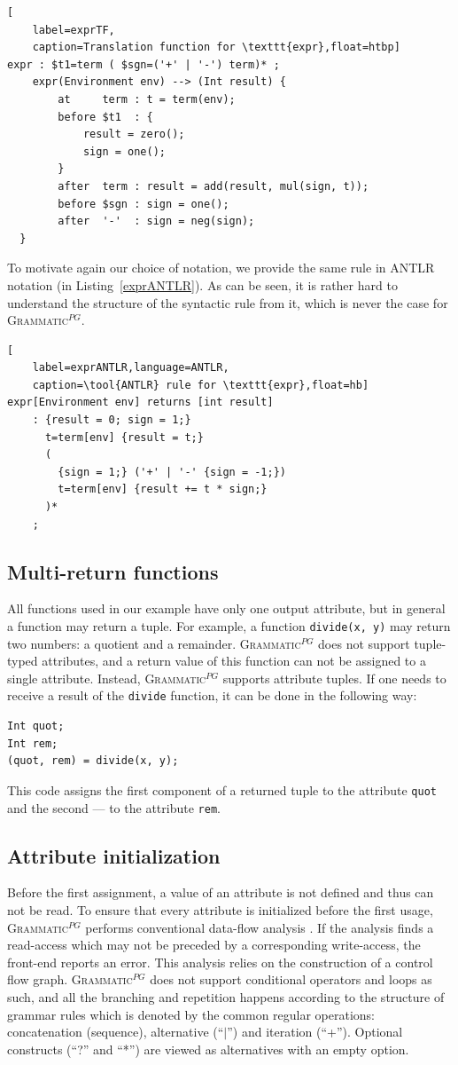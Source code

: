 \documentclass{llncs2e/llncs}
\newcommand{\lstref}[1]{Listing~\ref{#1}}
\newcommand{\tool}[1]{\textsc{#1}}
\newcommand{\ATF}{\textsc{Grammatic}$^{PG}$}
\begin{document}
\begin{lstlisting}[
	label=exprTF,
	caption=Translation function for \texttt{expr},float=htbp]
expr : $t1=term ( $sgn=('+' | '-') term)* ;         
	expr(Environment env) --> (Int result) {  
  		at     term : t = term(env);
		before $t1  : {
			result = zero();
			sign = one();
		}
		after  term : result = add(result, mul(sign, t));
		before $sgn : sign = one();
		after  '-'  : sign = neg(sign);
  }
\end{lstlisting}

To motivate again our choice of notation, we provide the same rule in \tool{ANTLR} notation (in \lstref{exprANTLR}). As can be seen, it is rather hard to understand the structure of the syntactic rule from it, which is never the case for \ATF{}.
\begin{lstlisting}[
	label=exprANTLR,language=ANTLR,
	caption=\tool{ANTLR} rule for \texttt{expr},float=hb]
expr[Environment env] returns [int result] 
	: {result = 0; sign = 1;} 
	  t=term[env] {result = t;}
	  (
 	    {sign = 1;} ('+' | '-' {sign = -1;}) 
	    t=term[env] {result += t * sign;}
	  )* 
	;         
\end{lstlisting}

\subsection{Multi-return functions}
All functions used in our example have only one output attribute, but in general a function may return a tuple. For example, a function \texttt{divide(x,~y)} may return two numbers: a quotient and a remainder. \ATF{} does not support tuple-typed attributes, and a return value of this function can not be assigned to a single attribute. Instead, \ATF{} supports attribute tuples. If one needs to receive a result of the \texttt{divide} function, it can be done in the following way:
\begin{lstlisting}
Int quot;
Int rem;
(quot, rem) = divide(x, y);
\end{lstlisting}
This code assigns the first component of a returned tuple to the attribute \texttt{quot} and the second --- to the attribute \texttt{rem}.

\subsection{Attribute initialization}

Before the first assignment, a value of an attribute is not defined and thus can not be read. To ensure that every attribute is initialized before the first usage, \ATF{} performs conventional data-flow analysis \cite{DataFlow}.
If the analysis finds a read-access which may not be preceded by a corresponding write-access, the front-end reports an error. This analysis relies on the construction of a control flow graph. \ATF{} does not support conditional operators and loops as such, and all the branching and repetition happens according to the structure of grammar rules which is denoted by the common regular operations: concatenation (sequence), alternative (``$|$'') and iteration (``+''). Optional constructs (``?'' and ``*'') are viewed as alternatives with an empty option.
\end{document}
